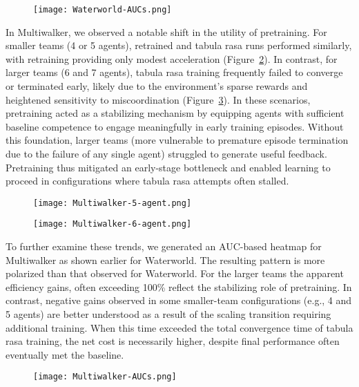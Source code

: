 \documentclass{article}
\begin{document}
\begin{figure}[h]
    \centering
    \texttt{[image: Waterworld-AUCs.png]}
    \caption{}
    \label{fig:waterworld-aucs}
\end{figure}


In Multiwalker, we observed a notable shift in the utility of pretraining. 
For smaller teams (4 or 5 agents), retrained and tabula rasa runs performed similarly, 
with retraining providing only modest acceleration (Figure~\ref{fig:multiwalker-5}). 
In contrast, for larger teams (6 and 7 agents), tabula rasa training frequently failed to 
converge or terminated early, likely due to the environment's sparse rewards and heightened 
sensitivity to miscoordination (Figure~\ref{fig:multiwalker-6}). 
In these scenarios, pretraining acted as a stabilizing mechanism by equipping agents 
with sufficient baseline competence to engage meaningfully in early training episodes. 
Without this foundation, larger teams (more vulnerable to premature episode termination 
due to the failure of any single agent) struggled to generate useful feedback. 
Pretraining thus mitigated an early-stage bottleneck and enabled learning to proceed 
in configurations where tabula rasa attempts often stalled.

\begin{figure}[h]
    \centering
    \texttt{[image: Multiwalker-5-agent.png]}
    \caption{}
    \label{fig:multiwalker-5}
\end{figure}

\begin{figure}[h]
    \centering
    \texttt{[image: Multiwalker-6-agent.png]}
    \caption{}
    \label{fig:multiwalker-6}
\end{figure}

To further examine these trends, we generated an AUC-based heatmap for Multiwalker as shown 
earlier for Waterworld. The resulting pattern is more polarized than that observed for Waterworld.
For the larger teams the apparent efficiency gains, often exceeding 100\%
reflect the stabilizing role of pretraining.
In contrast, negative gains observed in some smaller-team configurations (e.g., 4 and 5 agents) 
are better understood as a result of the scaling transition requiring additional training. 
When this time exceeded the total convergence time of tabula rasa training, 
the net cost is necessarily higher, despite final performance often eventually met the baseline.

\begin{figure}[h]
    \centering
    \texttt{[image: Multiwalker-AUCs.png]}
    \caption{}
    \label{fig:multiwalker-aucs}
\end{figure}
\end{document}

